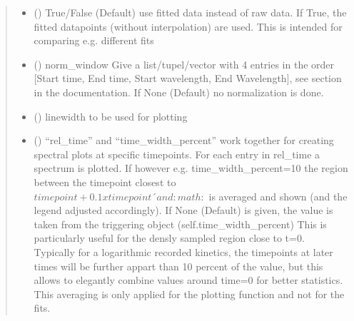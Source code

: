 \documentclass[letterpaper,10pt,english]{sphinxmanual}
\begin{document}
\begin{fulllineitems}
\begin{fulllineitems}
\begin{quote}
\begin{description}
\begin{itemize}
\item {} 
 (\sphinxstyleliteralemphasis{\sphinxupquote{, }}) \textendash{} True/False (Default) \sphinxhyphen{} use fitted data instead of raw data.
If True, the fitted datapoints (without interpolation) are used.
This is intended for comparing e.g. different fits

\item {} 
 (\sphinxstyleliteralemphasis{\sphinxupquote{ (}}\sphinxstyleliteralemphasis{\sphinxupquote{)}}\sphinxstyleliteralemphasis{\sphinxupquote{, }}) \textendash{} norm\_window Give a list/tupel/vector with 4 entries in the order
{[}Start \sphinxhyphen{} time, End \sphinxhyphen{} time, Start \sphinxhyphen{} wavelength, End \sphinxhyphen{} Wavelength{]},
see section  {\hyperref[\detokenize{Comparing:normalization-and-scaling}]{}}  in the documentation.
If None (Default) no normalization is done.

\item {} 
 (\sphinxstyleliteralemphasis{\sphinxupquote{, }}) \textendash{} linewidth to be used for plotting

\item {} 
 (\sphinxstyleliteralemphasis{\sphinxupquote{, }}) \textendash{} “rel\_time” and “time\_width\_percent” work together for creating spectral plots at
specific timepoints. For each entry in rel\_time a spectrum is plotted.
If however e.g. time\_width\_percent=10 the region between the timepoint closest
to \(timepoint+0.1xtimepoint´ and :math:\) is averaged and shown
(and the legend adjusted accordingly). If None (Default) is given, the value is
taken from the triggering object (self.time\_width\_percent) This is particularly useful for the densly
sampled region close to t=0. Typically for a logarithmic recorded kinetics, the
timepoints at later times will be further appart than 10 percent of the value,
but this allows to elegantly combine values around time=0 for better statistics.
This averaging is only applied for the plotting function and not for the fits.


\end{itemize}
\end{description}
\end{quote}
\end{fulllineitems}
\end{fulllineitems}
\end{document}
